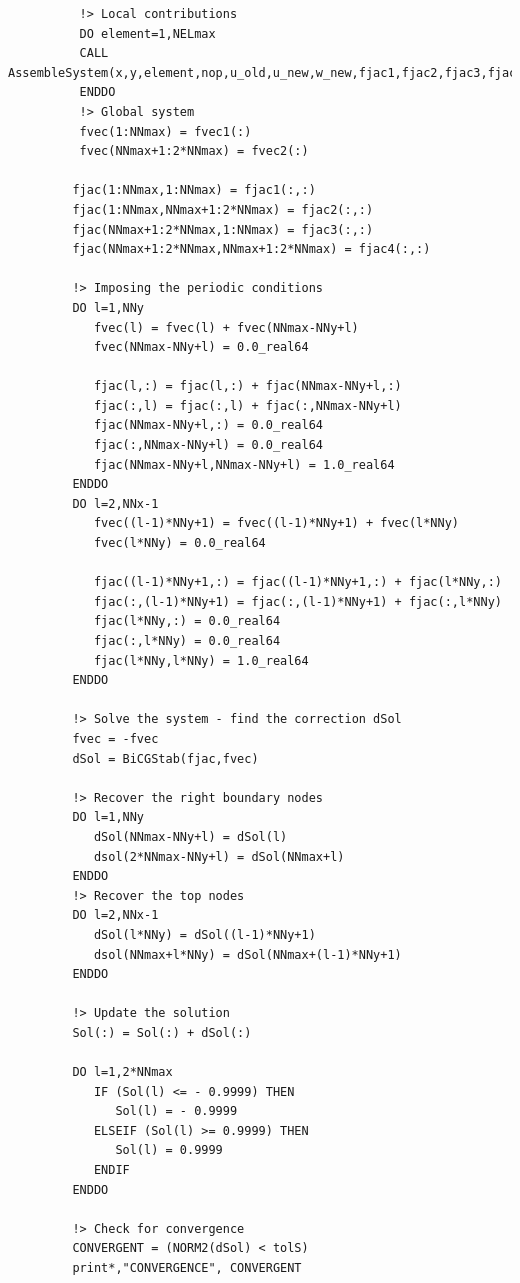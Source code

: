 \documentclass{article}
\begin{document}
\begin{verbatim}
          !> Local contributions
          DO element=1,NELmax
          CALL AssembleSystem(x,y,element,nop,u_old,u_new,w_new,fjac1,fjac2,fjac3,fjac4,fvec1,fvec2)
          ENDDO
          !> Global system 
          fvec(1:NNmax) = fvec1(:)
          fvec(NNmax+1:2*NNmax) = fvec2(:)

         fjac(1:NNmax,1:NNmax) = fjac1(:,:)
         fjac(1:NNmax,NNmax+1:2*NNmax) = fjac2(:,:)
         fjac(NNmax+1:2*NNmax,1:NNmax) = fjac3(:,:)
         fjac(NNmax+1:2*NNmax,NNmax+1:2*NNmax) = fjac4(:,:)

         !> Imposing the periodic conditions
         DO l=1,NNy 
            fvec(l) = fvec(l) + fvec(NNmax-NNy+l)
            fvec(NNmax-NNy+l) = 0.0_real64 

            fjac(l,:) = fjac(l,:) + fjac(NNmax-NNy+l,:)
            fjac(:,l) = fjac(:,l) + fjac(:,NNmax-NNy+l)
            fjac(NNmax-NNy+l,:) = 0.0_real64
            fjac(:,NNmax-NNy+l) = 0.0_real64
            fjac(NNmax-NNy+l,NNmax-NNy+l) = 1.0_real64
         ENDDO        
         DO l=2,NNx-1 
            fvec((l-1)*NNy+1) = fvec((l-1)*NNy+1) + fvec(l*NNy)
            fvec(l*NNy) = 0.0_real64 

            fjac((l-1)*NNy+1,:) = fjac((l-1)*NNy+1,:) + fjac(l*NNy,:)
            fjac(:,(l-1)*NNy+1) = fjac(:,(l-1)*NNy+1) + fjac(:,l*NNy)
            fjac(l*NNy,:) = 0.0_real64
            fjac(:,l*NNy) = 0.0_real64
            fjac(l*NNy,l*NNy) = 1.0_real64
         ENDDO        

         !> Solve the system - find the correction dSol
         fvec = -fvec
         dSol = BiCGStab(fjac,fvec)
         
         !> Recover the right boundary nodes
         DO l=1,NNy 
            dSol(NNmax-NNy+l) = dSol(l)
            dsol(2*NNmax-NNy+l) = dSol(NNmax+l)
         ENDDO 
         !> Recover the top nodes  
         DO l=2,NNx-1 
            dSol(l*NNy) = dSol((l-1)*NNy+1)
            dsol(NNmax+l*NNy) = dSol(NNmax+(l-1)*NNy+1)
         ENDDO 

         !> Update the solution
         Sol(:) = Sol(:) + dSol(:)

         DO l=1,2*NNmax
            IF (Sol(l) <= - 0.9999) THEN 
               Sol(l) = - 0.9999 
            ELSEIF (Sol(l) >= 0.9999) THEN 
               Sol(l) = 0.9999
            ENDIF   
         ENDDO   
     
         !> Check for convergence
         CONVERGENT = (NORM2(dSol) < tolS)
         print*,"CONVERGENCE", CONVERGENT


\end{verbatim}
\end{document}
